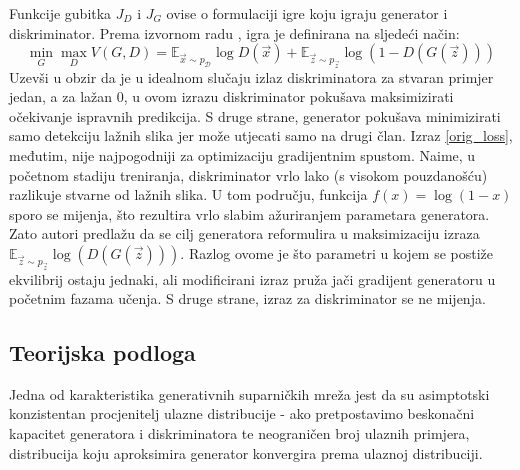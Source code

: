 Funkcije gubitka $J_D$ i $J_G$ ovise o formulaciji igre koju igraju generator i diskriminator. Prema izvornom radu \citep{orig_paper}, igra je definirana na sljedeći način:
\begin{equation}
\label{orig_loss}
\min_G \max_D V(G, D) = \mathbb{E}_{\vec{x} \sim p_{\mathcal{D}}}\log D(\vec{x}) + \mathbb{E}_{\vec{z} \sim p_{\vec{z}}} \log (1 - D(G(\vec{z})))
\end{equation}
Uzevši u obzir da je u idealnom slučaju izlaz diskriminatora za stvaran primjer jedan, a za lažan 0, u ovom izrazu diskriminator pokušava maksimizirati očekivanje ispravnih predikcija. S druge strane, generator pokušava minimizirati samo detekciju lažnih slika jer može utjecati samo na drugi član. Izraz \ref{orig_loss}, međutim, nije najpogodniji za optimizaciju gradijentnim spustom. Naime, u početnom stadiju treniranja, diskriminator vrlo lako (s visokom pouzdanošću) razlikuje stvarne od lažnih slika. U tom području, funkcija $f(x) = \log(1 - x)$ sporo se mijenja, što rezultira vrlo slabim ažuriranjem parametara generatora. Zato autori predlažu da se cilj generatora reformulira u maksimizaciju izraza $\mathbb{E}_{\vec{z} \sim p_{\vec{z}}} \log (D(G(\vec{z})))$. Razlog ovome je što parametri u kojem se postiže ekvilibrij ostaju jednaki, ali modificirani izraz pruža jači gradijent generatoru u početnim fazama učenja. S druge strane, izraz za diskriminator se ne mijenja. 

\subsection{Teorijska podloga}
Jedna od karakteristika generativnih suparničkih mreža jest da su asimptotski konzistentan procjenitelj ulazne distribucije - ako pretpostavimo beskonačni kapacitet generatora i diskriminatora te neograničen broj ulaznih primjera, distribucija koju aproksimira generator konvergira prema ulaznoj distribuciji.

